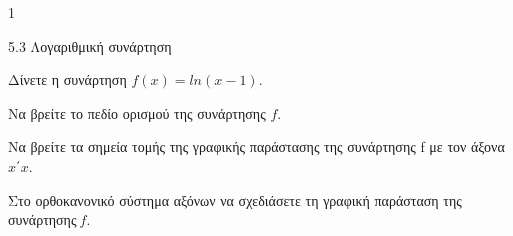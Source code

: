 \begin{ylh}{1}
\item 5.3 Λογαριθμική συνάρτηση
\end{ylh}
Δίνετε η συνάρτηση $f(x) = ln(x - 1)$.
\begin{alist}
\item Να βρείτε το πεδίο ορισμού της συνάρτησης $f$.
\item Να βρείτε τα σημεία τομής της γραφικής παράστασης της συνάρτησης f με τον άξονα $x΄x.\ $
\item Στο ορθοκανονικό σύστημα αξόνων να σχεδιάσετε τη γραφική παράσταση της συνάρτησης$\ f.$
\end{alist}

